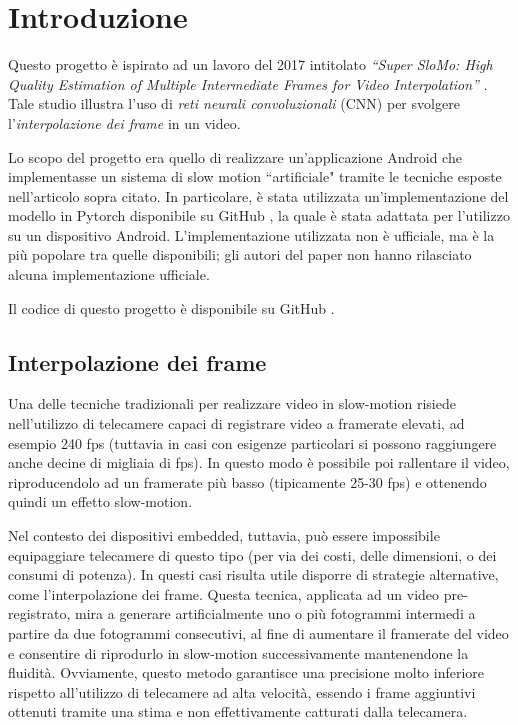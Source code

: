 \chapter*{Introduzione}

Questo progetto è ispirato ad un lavoro del 2017 intitolato 
\textit{``Super SloMo: High Quality Estimation of Multiple Intermediate Frames for Video Interpolation''} \cite{paper_superslomo}.
Tale studio illustra l'uso di \textit{reti neurali convoluzionali} (CNN) per svolgere l'\textit{interpolazione dei frame} 
in un video.

Lo scopo del progetto era quello di realizzare un'applicazione Android che implementasse un sistema di slow motion 
``artificiale" tramite le tecniche esposte nell'articolo sopra citato. In particolare, è stata utilizzata 
un'implementazione del modello in Pytorch disponibile su GitHub \cite{git_superslowmo}, la quale è stata adattata per l'utilizzo su un 
dispositivo Android. L'implementazione utilizzata non è ufficiale, ma è la più popolare tra quelle disponibili; gli autori del
paper non hanno rilasciato alcuna implementazione ufficiale.

Il codice di questo progetto è disponibile su GitHub \cite{git_progetto}.

\section*{Interpolazione dei frame}

Una delle tecniche tradizionali per realizzare video in slow-motion risiede nell'utilizzo di telecamere capaci di 
registrare video a framerate elevati, ad esempio 240 fps (tuttavia in casi con esigenze particolari si possono 
raggiungere anche decine di migliaia di fps). In questo modo è possibile poi rallentare il video, riproducendolo ad 
un framerate più basso (tipicamente 25-30 fps) e ottenendo quindi un effetto slow-motion.

Nel contesto dei dispositivi embedded, tuttavia, può essere impossibile equipaggiare telecamere di questo tipo (per via
dei costi, delle dimensioni, o dei consumi di potenza). In questi casi risulta utile disporre di strategie alternative, come l'interpolazione dei 
frame. Questa tecnica, applicata ad un video pre-registrato, mira a generare artificialmente uno o più fotogrammi intermedi 
a partire da due fotogrammi consecutivi, al fine di aumentare il framerate del video e consentire di riprodurlo in slow-motion
successivamente mantenendone la fluidità. Ovviamente, questo metodo garantisce una precisione molto inferiore rispetto
all'utilizzo di telecamere ad alta velocità, essendo i frame aggiuntivi ottenuti tramite una stima e non effettivamente
catturati dalla telecamera.

